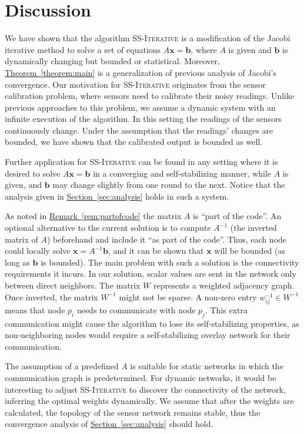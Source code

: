 \documentclass[preprint,12pt]{elsarticle}
\newcommand{\namedref}[2]{\hyperref[#2]{#1~\ref*{#2}}}
\newcommand{\sectionref}[1]{\namedref{Section}{#1}}
\newcommand{\theoremref}[1]{\namedref{Theorem}{#1}}
\newcommand{\remarkref}[1]{\namedref{Remark}{#1}}
\newcommand{\syncAlg}{\textsc{SS-Iterative}\xspace}
\newcommand{\xx}{\mathbf{x}}
\newcommand{\bb}{\mathbf{b}}
\begin{document}
\section{Discussion}\label{sec:discussion}
We have shown that the algorithm \syncAlg is a modification of the
Jacobi iterative method to solve a set of equations $A\xx=\bb$,
where $A$ is given and $\bb$ is dynamically changing but bounded or statistical.
Moreover, \theoremref{theorem:main} is a generalization of
previous analysis of Jacobi's convergence. Our motivation for
\syncAlg originates from the sensor calibration problem, where
sensors need to calibrate their noisy readings. Unlike previous
approaches to this problem, we assume a dynamic system with an
infinite execution of the algorithm. In this setting the readings
of the sensors continuously change. Under the assumption that the
readings' changes are bounded, we have shown that the calibrated
output is bounded as well.


Further application for \syncAlg can be found in any setting where
it is desired to solve $A\xx=\bb$ in a converging and
self-stabilizing manner, while $A$ is given, and $\bb$ may change
slightly from one round to the next. Notice that the analysis
given in
\sectionref{sec:analysis} holds in such a system.

As noted in \remarkref{rem:partofcode} the matrix $A$ is ``part of
the code''. An optional alternative to the current solution is to
compute $A^{-1}$ (the inverted matrix of $A$) beforehand and
include it ``as part of the code''. Thus, each node could locally
solve $\xx = A^{-1}\bb$, and it can be shown that $\xx$ will be
bounded (as long as $\bb$ is bounded). The main problem with such
a solution is the connectivity requirements it incurs. In our
solution, scalar values are sent in the network only between
direct neighbors. The matrix $W$ represents a weighted adjacency
graph. Once inverted, the matrix $W^{-1}$ might not be sparse.
A non-zero entry $w^{-1}_{ij} \in W^{-1}$ means that node $p_i$ needs
to communicate with node $p_j$. This extra communication might cause the algorithm to lose its self-stabilizing properties, as
non-neighboring nodes would require a self-stabilizing overlay
network for their communication.

The assumption of a predefined $A$ is suitable for static networks
in which the communication graph is predetermined. For dynamic
networks, it would be interesting to adjust \syncAlg to discover
the connectivity of the network, inferring the optimal weights dynamically.
We assume that after the weights are calculated, the topology of the
sensor network remains stable, thus the convergence analysis of \sectionref{sec:analysis} should hold.
\end{document}
